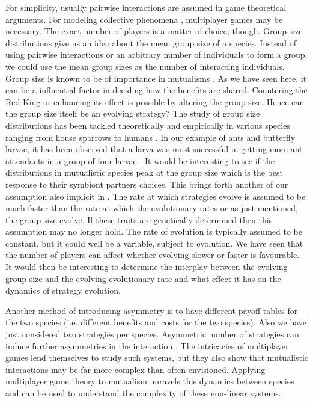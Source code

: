 \documentclass[aps,pre,amsfonts,floatfix, onecolumn,showkeys]{revtex4-1}
\begin{document}
For simplicity, usually pairwise interactions are assumed in game theoretical arguments.
For modeling collective phenomena \cite{couzin:Nature:2005,sumpter:book:2010}, multiplayer games may be necessary.
The exact number of players is a matter of choice, though.
Group size distributions give us an idea about the mean group size of a species.
Instead of using pairwise interactions or an arbitrary number of individuals to form a group, we could use the mean group sizes as the number of interacting individuals.
Group size is known to be of importance in mutualisms \cite{wilson:AmNat:1983}.
As we have seen here, it can be a influential factor in deciding how the benefits are shared.
Countering the Red King or enhancing its effect is possible by altering the group size.
Hence can the group size itself be an evolving strategy?
The study of group size distributions has been tackled theoretically \cite{krause:book:2002,hauert:Science:2002, niwa:JTB:2003,hauert:PRSB:2006, hauert:BT:2008,veelen:JTB:2010,sumpter:book:2010,braennstroem:JMB:2011,pena:Evolution:2011} and empirically in various species ranging from house sparrows to humans \cite{zipf:book:1949,krause:book:2002,sumpter:book:2010,griesser:PLosOne:2011}.
In our example of ants and butterfly larvae, it has been observed that a larva was most successful in getting more ant attendants in a group of four larvae \cite{pierce:BES:1987}.
It would be interesting to see if the distributions in mutualistic species peak at the group size which is the best response to their symbiont partners choices.
This brings forth another of our assumption also implicit in \cite{bergstrom:PNAS:2003}.
The rate at which strategies evolve is assumed to be much faster than the rate at which the evolutionary rates or as just mentioned, the group size evolve.
If these traits are genetically determined then this assumption may no longer hold.
The rate of evolution is typically assumed to be constant, but it could well be a variable, subject to evolution.
We have seen that the number of players can affect whether evolving slower or faster is favourable.
It would then be interesting to determine the interplay between the evolving group size and the evolving evolutionary rate and what effect it has on the dynamics of strategy evolution.

Another method of introducing asymmetry is to have different payoff tables for the two species (i.e. different benefits and costs for the two species).
Also we have just considered two strategies per species.
Asymmetric number of strategies can induce further asymmetries in the interaction \cite{schuster:BC:1981}.
The intricacies of multiplayer games lend themselves to study such systems, but they also show that mutualistic interactions may be far more complex than often envisioned.
Applying multiplayer game theory to mutualism unravels this dynamics between species and can be used to understand the complexity of these non-linear systems.
\end{document}

